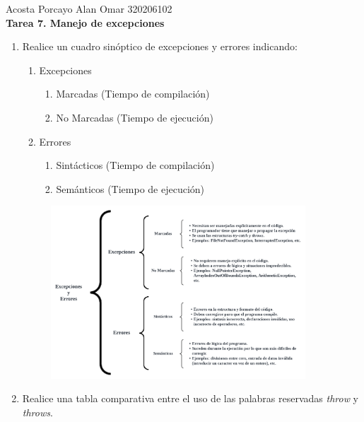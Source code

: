 \documentclass[12pt]{article}
\newcommand{\linejump}{\hfill \break}
\begin{document}
  \begin{center}
    Acosta Porcayo Alan Omar 320206102 \\
    \linejump
    \LARGE \textbf{Tarea 7. Manejo de excepciones}
  \end{center}
  
  \linejump
  \begin{enumerate}
    \item Realice un cuadro sinóptico de excepciones y errores indicando:
    \begin{enumerate}[label=\alph*.]
      \item Excepciones
      \begin{enumerate}[label=\roman*.]
        \item Marcadas (Tiempo de compilación)
        \item No Marcadas (Tiempo de ejecución)
      \end{enumerate}
      \item Errores
      \begin{enumerate}[label=\roman*.]
        \item Sintácticos (Tiempo de compilación)
        \item Semánticos (Tiempo de ejecución)
      \end{enumerate}
    \end{enumerate}

    \begin{figure}[h!]
      \centering
      \includegraphics[width=0.9\textwidth]{sinoptico.png}
    \end{figure}

    \newpage
    \item Realice una tabla comparativa entre el uso de las palabras reservadas \textit{throw} y \textit{throws}.
    

\end{enumerate}
\end{document}
